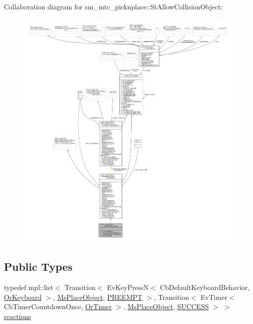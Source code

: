 Collaboration diagram for sm\+\_\+mtc\+\_\+picknplace\+:\+:St\+Allow\+Collision\+Object\+:
\nopagebreak
\begin{figure}[H]
\begin{center}
\leavevmode
\includegraphics[width=350pt]{structsm__mtc__picknplace_1_1StAllowCollisionObject__coll__graph}
\end{center}
\end{figure}
\subsection*{Public Types}
\begin{DoxyCompactItemize}
\item 
typedef mpl\+::list$<$ Transition$<$ Ev\+Key\+PressN$<$ Cb\+Default\+Keyboard\+Behavior, \hyperlink{classsm__mtc__picknplace_1_1OrKeyboard}{Or\+Keyboard} $>$, \hyperlink{classsm__mtc__picknplace_1_1MsPlaceObject}{Ms\+Place\+Object}, \hyperlink{classPREEMPT}{P\+R\+E\+E\+M\+PT} $>$, Transition$<$ Ev\+Timer$<$ Cb\+Timer\+Countdown\+Once, \hyperlink{classsm__mtc__picknplace_1_1OrTimer}{Or\+Timer} $>$, \hyperlink{classsm__mtc__picknplace_1_1MsPlaceObject}{Ms\+Place\+Object}, \hyperlink{classSUCCESS}{S\+U\+C\+C\+E\+SS} $>$ $>$ \hyperlink{structsm__mtc__picknplace_1_1StAllowCollisionObject_ab0947469c5bdd3d5c40d8100c7b86377}{reactions}
\end{DoxyCompactItemize}
